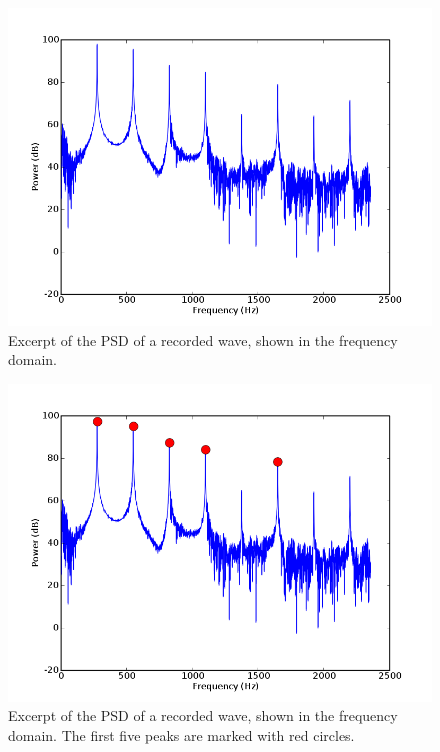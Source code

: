 \documentclass[twocolumn]{article}
\begin{document}
\begin{figure}
\centering
\includegraphics[width=\linewidth]{figures/psd.png}
\caption{Excerpt of the PSD of a recorded wave, shown in the frequency domain.}
\label{psd}
\end{figure}

\begin{figure}
\centering
\includegraphics[width=\linewidth]{figures/peaks.png}
\caption{Excerpt of the PSD of a recorded wave, shown in the frequency domain. The first five peaks are marked with red circles.}
\label{peaks}
\end{figure}
\end{document}

